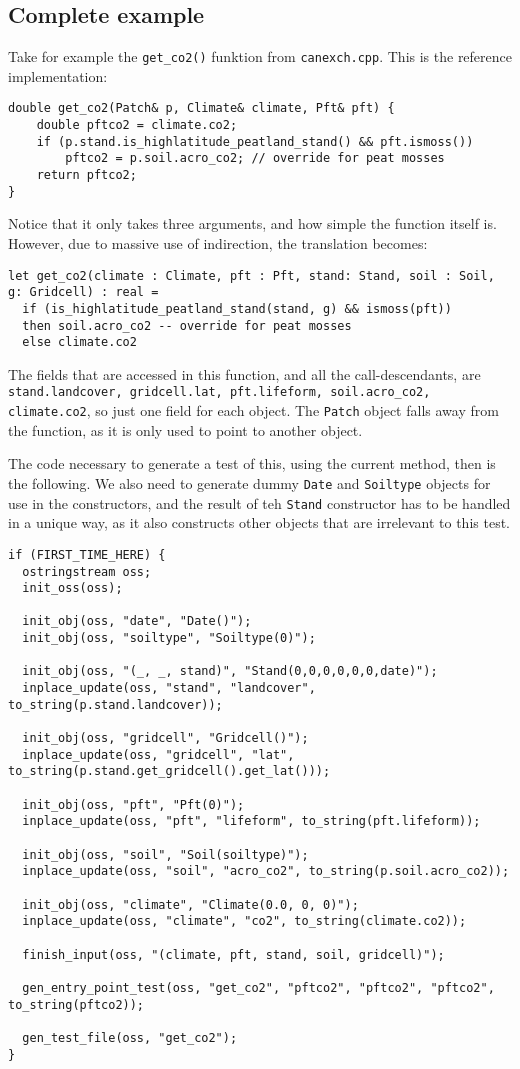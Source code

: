 \subsection{Complete example}
Take for example the \texttt{get_co2()} funktion from \texttt{canexch.cpp}. This is the reference implementation:
\begin{verbatim}
double get_co2(Patch& p, Climate& climate, Pft& pft) {
	double pftco2 = climate.co2;
	if (p.stand.is_highlatitude_peatland_stand() && pft.ismoss())
		pftco2 = p.soil.acro_co2; // override for peat mosses
	return pftco2;
}
\end{verbatim}
Notice that it only takes three arguments, and how simple the function itself is. However, due to massive use of indirection, the translation becomes:

\begin{verbatim}
let get_co2(climate : Climate, pft : Pft, stand: Stand, soil : Soil, g: Gridcell) : real =
  if (is_highlatitude_peatland_stand(stand, g) && ismoss(pft))
  then soil.acro_co2 -- override for peat mosses
  else climate.co2
\end{verbatim}

The fields that are accessed in this function, and all the call-descendants, are \texttt{stand.landcover, gridcell.lat, pft.lifeform, soil.acro_co2, climate.co2}, so just one field for each object. The \texttt{Patch} object falls away from the function, as it is only used to point to another object.

The code necessary to generate a test of this, using the current method, then is the following. We also need to generate dummy \texttt{Date} and \texttt{Soiltype} objects for use in the constructors, and the result of teh \texttt{Stand} constructor has to be handled in a unique way, as it also constructs other objects that are irrelevant to this test.

\begin{verbatim}
if (FIRST_TIME_HERE) {
  ostringstream oss;
  init_oss(oss);

  init_obj(oss, "date", "Date()");
  init_obj(oss, "soiltype", "Soiltype(0)");

  init_obj(oss, "(_, _, stand)", "Stand(0,0,0,0,0,0,date)");
  inplace_update(oss, "stand", "landcover", to_string(p.stand.landcover));

  init_obj(oss, "gridcell", "Gridcell()");
  inplace_update(oss, "gridcell", "lat", to_string(p.stand.get_gridcell().get_lat()));

  init_obj(oss, "pft", "Pft(0)");
  inplace_update(oss, "pft", "lifeform", to_string(pft.lifeform));

  init_obj(oss, "soil", "Soil(soiltype)");
  inplace_update(oss, "soil", "acro_co2", to_string(p.soil.acro_co2));

  init_obj(oss, "climate", "Climate(0.0, 0, 0)");
  inplace_update(oss, "climate", "co2", to_string(climate.co2));

  finish_input(oss, "(climate, pft, stand, soil, gridcell)");

  gen_entry_point_test(oss, "get_co2", "pftco2", "pftco2", "pftco2", to_string(pftco2));

  gen_test_file(oss, "get_co2");
}
\end{verbatim}

